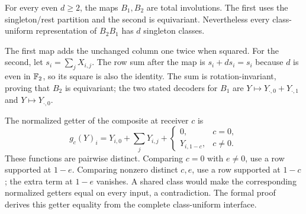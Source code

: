 \begin{proposition}
\label{prop:endpoint-class-blowup}
For every even $d\ge2$, the maps $B_1,B_2$ are total involutions.
The first uses the singleton/rest partition and the second is equivariant.
Nevertheless every class-uniform representation of $B_2B_1$ has $d$
singleton classes.
\end{proposition}
\begin{outline}
The first map adds the unchanged column one twice when squared.
For the second, let $s_i=\sum_jX_{i,j}$.  The row sum after the map
is $s_i+d s_i=s_i$ because $d$ is even in $\mathbb{F}_2$, so its square is
also the identity.  The sum is rotation-invariant, proving that $B_2$
is equivariant; the two stated decoders for $B_1$ are
$Y\mapsto Y_{\cdot,0}+Y_{\cdot,1}$ and $Y\mapsto Y_{\cdot,0}$.

The normalized getter of the composite at receiver $c$ is
\[
 g_c(Y)_i=Y_{i,0}+\sum_jY_{i,j}
   +\begin{cases}0,&c=0,\\Y_{i,1-c},&c\ne0.\end{cases}
\]
These functions are pairwise distinct.  Comparing $c=0$ with $e\ne0$,
use a row supported at $1-e$.  Comparing nonzero distinct $c,e$, use
a row supported at $1-c$; the extra term at $1-e$ vanishes.
A shared class would make the corresponding normalized getters equal
on every input, a contradiction.  The formal proof derives this getter
equality from the complete class-uniform interface.
\end{outline}
